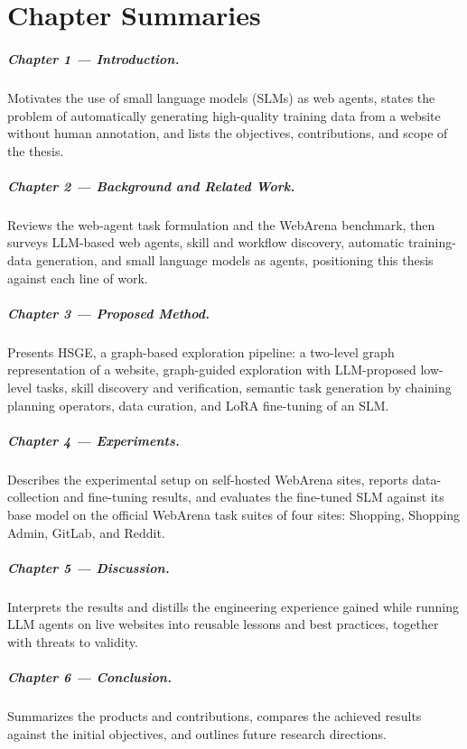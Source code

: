 \chapter*{Chapter Summaries}


\paragraph{Chapter 1 — Introduction.} Motivates the use of small language
models (SLMs) as web agents, states the problem of automatically generating
high-quality training data from a website without human annotation, and lists
the objectives, contributions, and scope of the thesis.

\paragraph{Chapter 2 — Background and Related Work.} Reviews the web-agent
task formulation and the WebArena benchmark, then surveys LLM-based web
agents, skill and workflow discovery, automatic training-data generation, and
small language models as agents, positioning this thesis against each line of
work.

\paragraph{Chapter 3 — Proposed Method.} Presents HSGE, a graph-based
exploration pipeline: a two-level graph representation of a website, graph-guided
exploration with LLM-proposed low-level tasks, skill discovery and
verification, semantic task generation by chaining planning operators, data
curation, and LoRA fine-tuning of an SLM.

\paragraph{Chapter 4 — Experiments.} Describes the experimental setup on
self-hosted WebArena sites, reports data-collection and fine-tuning results,
and evaluates the fine-tuned SLM against its base model on the official
WebArena task suites of four sites: Shopping, Shopping Admin, GitLab, and
Reddit.

\paragraph{Chapter 5 — Discussion.} Interprets the results and distills the
engineering experience gained while running LLM agents on live websites into
reusable lessons and best practices, together with threats to validity.

\paragraph{Chapter 6 — Conclusion.} Summarizes the products and contributions,
compares the achieved results against the initial objectives, and outlines
future research directions.
